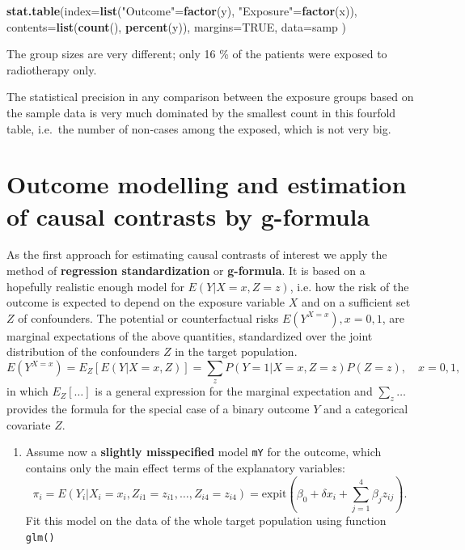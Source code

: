 \documentclass[
]{book}
\newenvironment{Shaded}{\begin{snugshade}}{\end{snugshade}}
\newcommand{\AttributeTok}[1]{\textcolor[rgb]{0.13,0.29,0.53}{#1}}
\newcommand{\ConstantTok}[1]{\textcolor[rgb]{0.56,0.35,0.01}{#1}}
\newcommand{\FunctionTok}[1]{\textcolor[rgb]{0.13,0.29,0.53}{\textbf{#1}}}
\newcommand{\NormalTok}[1]{#1}
\newcommand{\OtherTok}[1]{\textcolor[rgb]{0.56,0.35,0.01}{#1}}
\newcommand{\StringTok}[1]{\textcolor[rgb]{0.31,0.60,0.02}{#1}}
\providecommand{\tightlist}{%
  \setlength{\itemsep}{0pt}\setlength{\parskip}{0pt}}
\begin{document}
\begin{Shaded}
\begin{Highlighting}[]
\FunctionTok{stat.table}\NormalTok{(}\AttributeTok{index=}\FunctionTok{list}\NormalTok{(}\StringTok{"Outcome"}\OtherTok{=}\FunctionTok{factor}\NormalTok{(y), }\StringTok{"Exposure"}\OtherTok{=}\FunctionTok{factor}\NormalTok{(x)),}
           \AttributeTok{contents=}\FunctionTok{list}\NormalTok{(}\FunctionTok{count}\NormalTok{(), }\FunctionTok{percent}\NormalTok{(y)),}
           \AttributeTok{margins=}\ConstantTok{TRUE}\NormalTok{, }\AttributeTok{data=}\NormalTok{samp  )}
\end{Highlighting}
\end{Shaded}

The group sizes are very different; only 16 \% of the patients were
exposed to radiotherapy only.

The statistical precision in any comparison between the exposure groups
based on the sample data is very much dominated by the smallest count in
this fourfold table, i.e.~the number of non-cases among the exposed,
which is not very big.

\section{Outcome modelling and estimation of causal contrasts by g-formula}\label{outcome-modelling-and-estimation-of-causal-contrasts-by-g-formula}

As the first approach for estimating causal contrasts of interest we
apply the method of \textbf{regression standardization} or \textbf{g-formula}. It
is based on a hopefully realistic enough model for \(E(Y|X=x, Z=z)\), i.e.
how the risk of the outcome is expected to depend on the exposure
variable \(X\) and on a sufficient set \(Z\) of confounders. The potential
or counterfactual risks \(E(Y^{X=x}), x=0,1\), are marginal expectations
of the above quantities, standardized over the joint distribution of the
confounders \(Z\) in the target population.
\[ E(Y^{X=x}) = E_Z[E(Y|X=x,Z)]
       = \sum_z P(Y=1|X=x, Z=z)P(Z=z), \quad x=0,1, \]
in which \(E_Z[\dots]\) is a general expression for the marginal
expectation and \(\sum_z \dots\) provides the formula for the special
case of a binary outcome \(Y\) and a categorical covariate \(Z\).

\begin{enumerate}
\def\labelenumi{\arabic{enumi}.}
\tightlist
\item
  Assume now a \textbf{slightly misspecified} model \texttt{mY} for the outcome,
  which contains only the main effect terms of the explanatory
  variables:
  \[ \pi_i = E(Y_i|X_i=x_i, Z_{i1}=z_{i1}, \dots, Z_{i4}=z_{i4}) =
    \text{expit}\left(\beta_0 + \delta x_i +
    \sum_{j=1}^4 \beta_j z_{ij} \right) . \] Fit this model on the
  data of the whole target population using function \texttt{glm()}
\end{enumerate}
\end{document}
